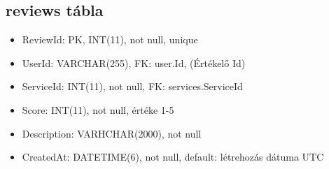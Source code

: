 \documentclass[11pt]{article}
\begin{document}
\subsection{reviews tábla}
\label{sec:orgb641637}
\begin{itemize}
\item ReviewId: PK, INT(11), not null, unique
\item UserId: VARCHAR(255), FK: user.Id, (Értékelő Id)
\item ServiceId: INT(11), not null, FK: services.ServiceId
\item Score: INT(11), not null, értéke 1-5
\item Description: VARHCHAR(2000), not null
\item CreatedAt: DATETIME(6), not null, default: létrehozás dátuma UTC
\end{itemize}
\end{document}
